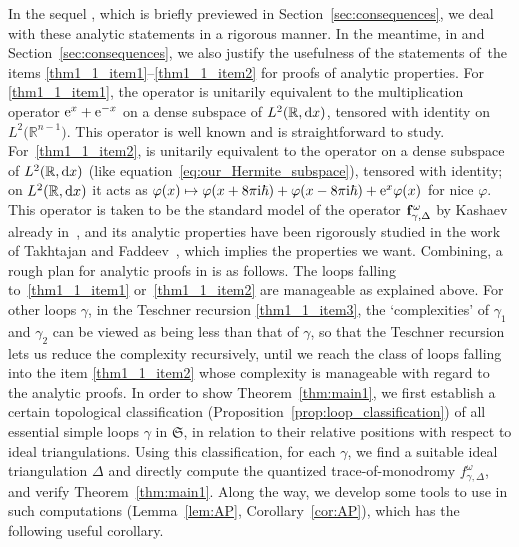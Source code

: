 \documentclass[10pt,a4paper]{amsart}
\numberwithin{equation}{section}
\theoremstyle{definition}
\begin{document}
In the sequel \cite{sequel}, which is briefly previewed in Section~\ref{sec:consequences}, we deal with these analytic statements in a rigorous manner.
In the meantime, in \cite{sequel} and Section~\ref{sec:consequences}, we also justify the usefulness of the statements of~the items \ref{thm1_1_item1}--\ref{thm1_1_item2} for proofs of analytic properties. For \ref{thm1_1_item1}, the operator  is unitarily equivalent to the multiplication operator ${\rm e}^x + {\rm e}^{-x}$ on a dense subspace of $L^2(\mathbb{R},{\rm d}x)$, tensored with identity on $L^2\bigl(\mathbb{R}^{n-1}\bigr)$. This operator is well known and is straightforward to study. For~\ref{thm1_1_item2},  is unitarily equivalent to the operator  on a dense subspace of $L^2(\mathbb{R},{\rm d}x)$ (like equation~\eqref{eq:our_Hermite_subspace}), tensored with identity; on $L^2(\mathbb{R},{\rm d}x)$ it acts as $\varphi(x) \mapsto \varphi(x+8\pi {\rm i} \hbar) + \varphi(x-8\pi {\rm i} \hbar) + {\rm e}^x \varphi(x)$ for nice $\varphi$. This operator is taken to be the standard model of the operator ${\bf f}^\omega_{\gamma,\Delta}$ by Kashaev already in~\cite{Kash00}, and its analytic properties have been rigorously studied in the work of Takhtajan and Faddeev~\cite{FT}, which implies the properties we want.
Combining, a rough plan for analytic proofs in \cite{sequel} is as follows. The loops falling to~\ref{thm1_1_item1} or~\ref{thm1_1_item2} are manageable as explained above. For other loops $\gamma$, in the Teschner recursion \ref{thm1_1_item3}, the `complexities' of $\gamma_1$ and $\gamma_2$ can be viewed as being less than that of $\gamma$, so that the Teschner recursion lets us reduce the complexity recursively, until we reach the class of loops falling into the item \ref{thm1_1_item2} whose complexity is manageable with regard to the analytic proofs.
In order to show Theorem~\ref{thm:main1}, we first establish a certain topological classification (Proposition~\ref{prop:loop_classification}) of all essential simple loops $\gamma$ in $\mathfrak{S}$, in relation to their relative positions with respect to ideal triangulations. Using this classification, for each $\gamma$, we find a suitable ideal triangulation $\Delta$ and directly compute the quantized trace-of-monodromy $f^\omega_{\gamma,\Delta}$, and verify Theorem~\ref{thm:main1}. Along the way, we develop some tools to use in such computations (Lemma~\ref{lem:AP}, Corollary~\ref{cor:AP}), which has the following useful corollary.
\end{document}
